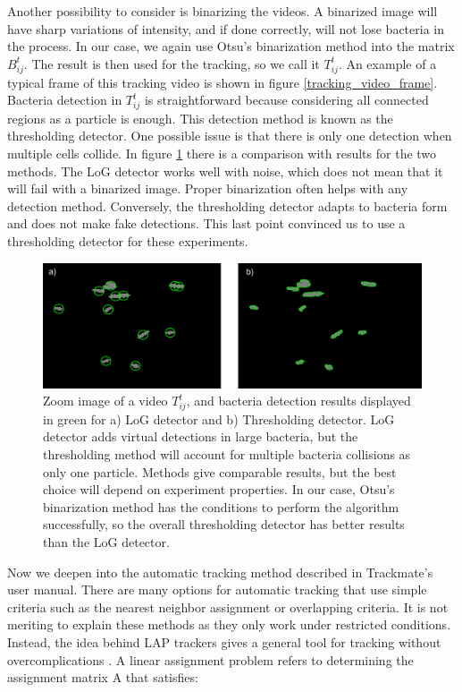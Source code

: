Another possibility to consider is binarizing the videos. A binarized image will have sharp variations of intensity, and if done correctly, will not lose bacteria in the process. In our case, we again use Otsu's binarization method into the matrix $B_{ij}^t$. The result is then used for the tracking, so we call it $T_{ij}^t$. An example of a typical frame of this tracking video is shown in figure \ref{tracking_video_frame}. Bacteria detection in  $T_{ij}^t$ is straightforward because considering all connected regions as a particle is enough. This detection method is known as the thresholding detector. One possible issue is that there is only one detection when multiple cells collide. In figure \ref{detection_method_comparison} there is a comparison with results for the two methods. The LoG detector works well with noise, which does not mean that it will fail with a binarized image. Proper binarization often helps with any detection method. Conversely, the thresholding detector adapts to bacteria form and does not make fake detections. This last point convinced us to use a thresholding detector for these experiments.

\begin{figure}
	\centering
	\includegraphics[width=\linewidth]{imagenes/detection_method_comparison.png}
	\caption[Detection method comparison]{ Zoom image of a video $T_{ij}^t$, and bacteria detection results displayed in green for a) LoG detector and b) Thresholding detector. LoG detector adds virtual detections in large bacteria, but the thresholding method will account for multiple bacteria collisions as only one particle. Methods give comparable results, but the best choice will depend on experiment properties. In our case, Otsu's binarization method has the conditions to perform the algorithm successfully, so the overall thresholding detector has better results than the LoG detector. }
	\label{detection_method_comparison}
\end{figure}

Now we deepen into the automatic tracking method described in Trackmate's user manual. There are many options for automatic tracking that use simple criteria such as the nearest neighbor assignment or overlapping criteria. It is not meriting to explain these methods as they only work under restricted conditions. Instead, the idea behind LAP trackers gives a general tool for tracking without overcomplications \cite{Jaqaman2008RobustSequences}. A linear assignment problem refers to determining the assignment matrix A that satisfies:

